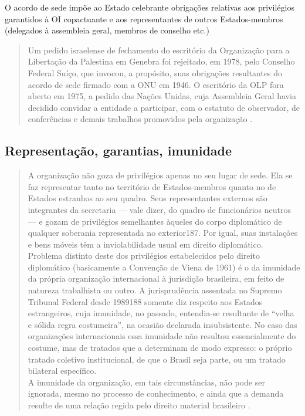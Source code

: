 \documentclass{article}
\begin{document}
O acordo de sede impõe ao Estado celebrante obrigações relativas aos privilégios garantidos à OI copactuante e aos representantes de outros Estados-membros (delegados à assembleia geral, membros de conselho etc.)

\begin{quote}
    Um pedido israelense de fechamento do escritório da Organização para a Libertação da Palestina em Genebra foi rejeitado, em 1978, pelo Conselho Federal Suíço, que invocou, a propósito, suas obrigações resultantes do acordo de sede firmado com a ONU em 1946. O escritório da OLP fora aberto em 1975, a pedido das Nações Unidas, cuja Assembleia Geral havia decidido convidar a entidade a participar, com o estatuto de observador, de conferências e demais trabalhos promovidos pela organização \cite[p. 110]{rezek_direito_2024}.
\end{quote}

\subsection{ Representação, garantias, imunidade}

\begin{quote}
   A organização não goza de privilégios apenas no seu lugar de sede. Ela se faz representar tanto no território de Estados-membros quanto no de Estados estranhos ao seu quadro. Seus representantes externos são integrantes da secretaria — vale dizer, do quadro de funcionários neutros — e gozam de privilégios semelhantes àqueles do corpo diplomático de qualquer soberania representada no exterior187. Por igual, suas instalações e bens móveis têm a inviolabilidade usual em direito diplomático.\\
   Problema distinto deste dos privilégios estabelecidos pelo direito diplomático (basicamente a Convenção de Viena de 1961) é o da imunidade da própria organização internacional à jurisdição brasileira, em feito de natureza trabalhista ou outro. A jurisprudência assentada no Supremo Tribunal Federal desde 1989188 somente diz respeito aos Estados estrangeiros, cuja imunidade, no passado, entendia-se resultante de “velha e sólida regra costumeira”, na ocasião declarada insubsistente. No caso das organizações internacionais essa imunidade não resultou essencialmente do costume, mas de tratados que a determinam de modo expresso: o próprio tratado coletivo institucional, de que o Brasil seja parte, ou um tratado bilateral específico.\\
   A imunidade da organização, em tais circunstâncias, não pode ser ignorada, mesmo no processo de conhecimento, e ainda que a demanda resulte de uma relação regida pelo direito material brasileiro \cite[p. 111]{rezek_direito_2024}.
\end{quote}
\end{document}
